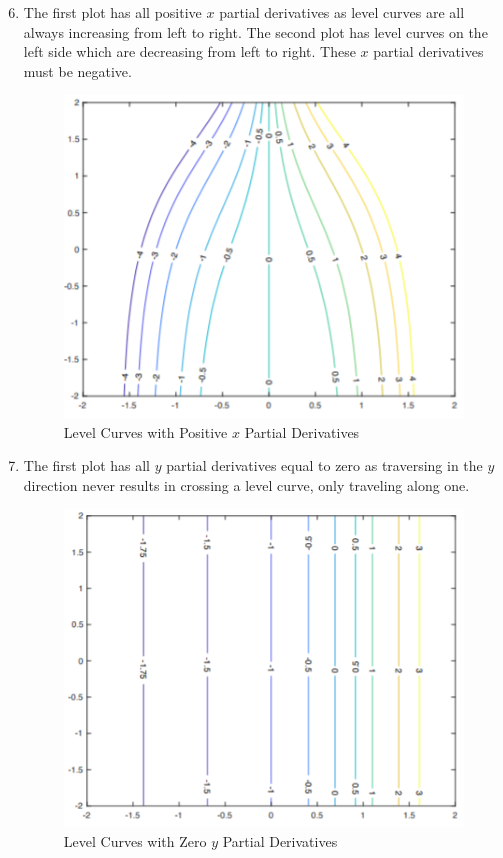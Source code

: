 \documentclass{article}
\begin{document}
\begin{enumerate}[1.]
  \setcounter{enumi}{5}
  \item The first plot has all positive $x$ partial derivatives as level curves
    are all always increasing from left to right. The second plot has level
    curves on the left side which are decreasing from left to right. These $x$
    partial derivatives must be negative.

    \begin{figure}[H]
      \centering
      \includegraphics[scale=0.60]{"LevelCurvesWithPositiveXPartial"}
      \caption{Level Curves with Positive $x$ Partial Derivatives}
    \end{figure}

  \item The first plot has all $y$ partial derivatives equal to zero as
    traversing in the $y$ direction never results in crossing a level curve,
    only traveling along one.

    \begin{figure}[H]
      \centering
      \includegraphics[scale=0.60]{"LevelCurvesWithZeroYPartial"}
      \caption{Level Curves with Zero $y$ Partial Derivatives}
    \end{figure}


\end{enumerate}
\end{document}
